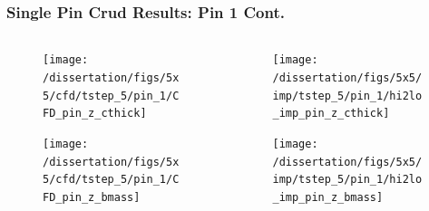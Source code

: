 \documentclass[t, pdftex]{beamer}
\begin{document}
\begin{frame}
\frametitle{\small Single Pin Crud Results: Pin 1  Cont.}
\vspace{-22pt}
\begin{columns}
    \begin{column}{0.5\textwidth}
        \vspace{-12.5pt}
        \begin{figure}[H]%
            \texttt{[image: /dissertation/figs/5x5/cfd/tstep\_5/pin\_1/CFD\_pin\_z\_cthick]}
        \end{figure}
        \vspace{-26pt}
        \begin{figure}[H]%
            \texttt{[image: /dissertation/figs/5x5/cfd/tstep\_5/pin\_1/CFD\_pin\_z\_bmass]}
     
        \end{figure}
    \end{column}
    \begin{column}{0.5\textwidth}
          \vspace{-12.5pt}
        \begin{figure}[H]%
            \texttt{[image: /dissertation/figs/5x5/imp/tstep\_5/pin\_1/hi2lo\_imp\_pin\_z\_cthick]}
        \end{figure}
        \vspace{-26pt}
        \begin{figure}[H]%
            \texttt{[image: /dissertation/figs/5x5/imp/tstep\_5/pin\_1/hi2lo\_imp\_pin\_z\_bmass]}
        \end{figure}
    \end{column}
\end{columns}
\end{frame}
\end{document}
